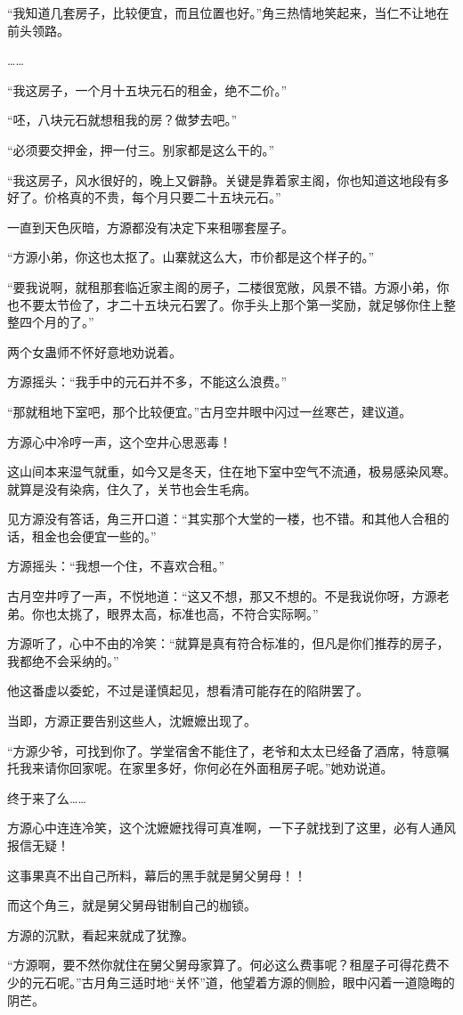 \begin{this_body}
“我知道几套房子，比较便宜，而且位置也好。”角三热情地笑起来，当仁不让地在前头领路。

……

“我这房子，一个月十五块元石的租金，绝不二价。”

“呸，八块元石就想租我的房？做梦去吧。”

“必须要交押金，押一付三。别家都是这么干的。”

“我这房子，风水很好的，晚上又僻静。关键是靠着家主阁，你也知道这地段有多好了。价格真的不贵，每个月只要二十五块元石。”

一直到天色灰暗，方源都没有决定下来租哪套屋子。

“方源小弟，你这也太抠了。山寨就这么大，市价都是这个样子的。”

“要我说啊，就租那套临近家主阁的房子，二楼很宽敞，风景不错。方源小弟，你也不要太节俭了，才二十五块元石罢了。你手头上那个第一奖励，就足够你住上整整四个月的了。”

两个女蛊师不怀好意地劝说着。

方源摇头：“我手中的元石并不多，不能这么浪费。”

“那就租地下室吧，那个比较便宜。”古月空井眼中闪过一丝寒芒，建议道。

方源心中冷哼一声，这个空井心思恶毒！

这山间本来湿气就重，如今又是冬天，住在地下室中空气不流通，极易感染风寒。就算是没有染病，住久了，关节也会生毛病。

见方源没有答话，角三开口道：“其实那个大堂的一楼，也不错。和其他人合租的话，租金也会便宜一些的。”

方源摇头：“我想一个住，不喜欢合租。”

古月空井哼了一声，不悦地道：“这又不想，那又不想的。不是我说你呀，方源老弟。你也太挑了，眼界太高，标准也高，不符合实际啊。”

方源听了，心中不由的冷笑：“就算是真有符合标准的，但凡是你们推荐的房子，我都绝不会采纳的。”

他这番虚以委蛇，不过是谨慎起见，想看清可能存在的陷阱罢了。

当即，方源正要告别这些人，沈嬷嬷出现了。

“方源少爷，可找到你了。学堂宿舍不能住了，老爷和太太已经备了酒席，特意嘱托我来请你回家呢。在家里多好，你何必在外面租房子呢。”她劝说道。

终于来了么……

方源心中连连冷笑，这个沈嬷嬷找得可真准啊，一下子就找到了这里，必有人通风报信无疑！

这事果真不出自己所料，幕后的黑手就是舅父舅母！！

而这个角三，就是舅父舅母钳制自己的枷锁。

方源的沉默，看起来就成了犹豫。

“方源啊，要不然你就住在舅父舅母家算了。何必这么费事呢？租屋子可得花费不少的元石呢。”古月角三适时地“关怀”道，他望着方源的侧脸，眼中闪着一道隐晦的阴芒。

\end{this_body}

